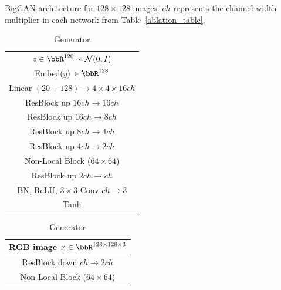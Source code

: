 \begin{table}[ht]
         \caption{\label{tab:resnets_imagenet128} BigGAN architecture for $128\times 128$ images. $ch$ represents the channel width multiplier in each network from Table~\ref{ablation_table}.}
          \centering
          \small
          \begin{subtable}{.4\textwidth}
              \centering
              {\begin{tabular}{c}
                  \toprule
                  \midrule
                  $z\in \bbR^{120} \sim \mathcal{N}(0, I)$ \\
                  Embed($y$) $\in \bbR^{128}$ \\
                  \midrule
                  Linear $(20+128) \rightarrow 4 \times 4 \times 16 ch $ \\
                  \midrule
                  ResBlock up $16ch \rightarrow 16ch$ \\
                  \midrule
                  ResBlock up $16ch \rightarrow 8ch$\\
                  \midrule
                  ResBlock up $8ch \rightarrow 4ch$\\
                  \midrule
                  ResBlock up $4ch \rightarrow 2ch$\\
                  \midrule
                  Non-Local Block ($64\times 64$)\\
                  \midrule
                  ResBlock up $2ch \rightarrow ch$\\
                  \midrule
                  BN, ReLU, $3\times 3$ Conv $ch\rightarrow 3$ \\
                  \midrule
                  Tanh\\
                  \midrule
                  \bottomrule
              \end{tabular}}
              \caption{\label{tab:gen_resnet_imagenet_128} Generator}
          \end{subtable}
          \begin{subtable}{.4\textwidth}
              \centering
              {\begin{tabular}{c}
                  \toprule
                  \midrule
                  RGB image $x\in \bbR^{128 \times 128 \times 3}$ \\
                  \midrule
                  ResBlock down $ch \rightarrow 2ch$\\
                  \midrule
                  Non-Local Block ($64\times 64$) \\

\end{tabular}}
\end{subtable}
\end{table}
